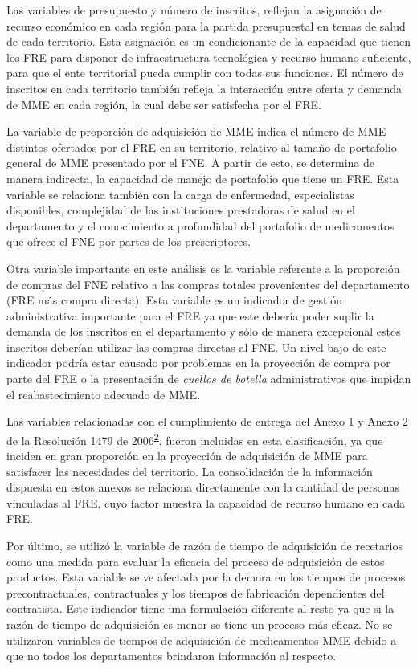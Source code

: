 \documentclass[
  oneside]{book}
\begin{document}
Las variables de presupuesto y número de inscritos, reflejan la asignación de recurso económico en cada región para la partida presupuestal en temas de salud de cada territorio. Esta asignación es un condicionante de la capacidad que tienen los FRE para disponer de infraestructura tecnológica y recurso humano suficiente, para que el ente territorial pueda cumplir con todas sus funciones. El número de inscritos en cada territorio también refleja la interacción entre oferta y demanda de MME en cada región, la cual debe ser satisfecha por el FRE.

La variable de proporción de adquisición de MME indica el número de MME distintos ofertados por el FRE en su territorio, relativo al tamaño de portafolio general de MME presentado por el FNE. A partir de esto, se determina de manera indirecta, la capacidad de manejo de portafolio que tiene un FRE. Esta variable se relaciona también con la carga de enfermedad, especialistas disponibles, complejidad de las instituciones prestadoras de salud en el departamento y el conocimiento a profundidad del portafolio de medicamentos que ofrece el FNE por partes de los prescriptores.

Otra variable importante en este análisis es la variable referente a la proporción de compras del FNE relativo a las compras totales provenientes del departamento (FRE más compra directa). Esta variable es un indicador de gestión administrativa importante para el FRE ya que este debería poder suplir la demanda de los inscritos en el departamento y sólo de manera excepcional estos inscritos deberían utilizar las compras directas al FNE. Un nivel bajo de este indicador podría estar causado por problemas en la proyección de compra por parte del FRE o la presentación de \emph{cuellos de botella} administrativos que impidan el reabastecimiento adecuado de MME.

Las variables relacionadas con el cumplimiento de entrega del Anexo 1 y Anexo 2 de la Resolución 1479 de 2006\textsuperscript{\protect\hyperlink{ref-MSPS1479-2006}{2}}, fueron incluidas en esta clasificación, ya que inciden en gran proporción en la proyección de adquisición de MME para satisfacer las necesidades del territorio. La consolidación de la información dispuesta en estos anexos se relaciona directamente con la cantidad de personas vinculadas al FRE, cuyo factor muestra la capacidad de recurso humano en cada FRE.

Por último, se utilizó la variable de razón de tiempo de adquisición de recetarios como una medida para evaluar la eficacia del proceso de adquisición de estos productos. Esta variable se ve afectada por la demora en los tiempos de procesos precontractuales, contractuales y los tiempos de fabricación dependientes del contratista. Este indicador tiene una formulación diferente al resto ya que si la razón de tiempo de adquisición es menor se tiene un proceso más eficaz. No se utilizaron variables de tiempos de adquisición de medicamentos MME debido a que no todos los departamentos brindaron información al respecto.
\end{document}
